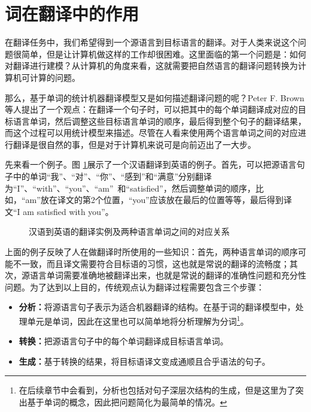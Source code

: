 \section{词在翻译中的作用}

\parinterval 在翻译任务中，我们希望得到一个源语言到目标语言的翻译。对于人类来说这个问题很简单，但是让计算机做这样的工作却很困难。这里面临的第一个问题是：如何对翻译进行建模？从计算机的角度来看，这就需要把自然语言的翻译问题转换为计算机可计算的问题。

\parinterval 那么，基于单词的统计机器翻译模型又是如何描述翻译问题的呢？Peter F. Brown等人提出了一个观点：在翻译一个句子时，可以把其中的每个单词翻译成对应的目标语言单词，然后调整这些目标语言单词的顺序，最后得到整个句子的翻译结果，而这个过程可以用统计模型来描述。尽管在人看来使用两个语言单词之间的对应进行翻译是很自然的事，但是对于计算机来说可是向前迈出了一大步。

\parinterval 先来看一个例子。图 \ref{fig:5-1}展示了一个汉语翻译到英语的例子。首先，可以把源语言句子中的单词“我”、“对”、“你”、“感到”和“满意”分别翻译为“I”、“with”、“you”、“am”\ 和“satisfied”，然后调整单词的顺序，比如，“am”放在译文的第2个位置，“you”应该放在最后的位置等等，最后得到译文“I am satisfied with you”。

\begin{figure}[htp]
    \centering

    \caption{汉语到英语的翻译实例及两种语言单词之间的对应关系}
    \label{fig:5-1}
\end{figure}

\parinterval 上面的例子反映了人在做翻译时所使用的一些知识：首先，两种语言单词的顺序可能不一致，而且译文需要符合目标语的习惯，这也就是常说的翻译的流畅度；其次，源语言单词需要准确地被翻译出来，也就是常说的翻译的准确性问题和充分性问题。为了达到以上目的，传统观点认为翻译过程需要包含三个步骤：

\begin{itemize}
\vspace{0.5em}
\item {\small\sffamily\bfseries{分析：}}将源语言句子表示为适合机器翻译的结构。在基于词的翻译模型中，处理单元是单词，因此在这里也可以简单地将分析理解为分词\footnote{在后续章节中会看到，分析也包括对句子深层次结构的生成，但是这里为了突出基于单词的概念，因此把问题简化为最简单的情况。}。
\vspace{0.5em}
\item {\small\sffamily\bfseries{转换：}}把源语言句子中的每个单词翻译成目标语言单词。
\vspace{0.5em}
\item {\small\sffamily\bfseries{生成：}}基于转换的结果，将目标语译文变成通顺且合乎语法的句子。
\vspace{0.5em}
\end{itemize}


